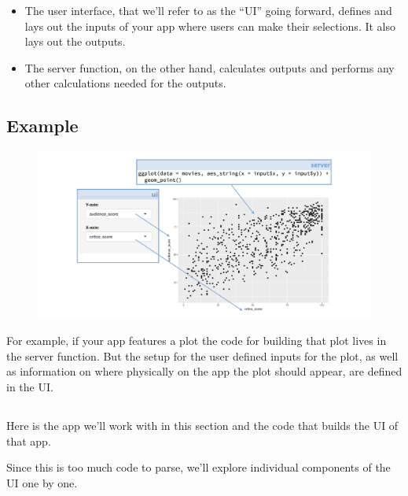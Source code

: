\documentclass[
  letterpaper,
  DIV=11,
  numbers=noendperiod]{scrreprt}
\begin{document}
\begin{itemize}
\item
  The user interface, that we'll refer to as the ``UI'' going forward,
  defines and lays out the inputs of your app where users can make their
  selections. It also lays out the outputs.
\item
  The server function, on the other hand, calculates outputs and
  performs any other calculations needed for the outputs.
\end{itemize}

\hypertarget{example-1}{%
\subsection{Example}\label{example-1}}

\begin{figure}

{\centering \includegraphics[width=1\textwidth,height=\textheight]{./images/ui-to-scatterplot.png}

}

\end{figure}

For example, if your app features a plot the code for building that plot
lives in the server function. But the setup for the user defined inputs
for the plot, as well as information on where physically on the app the
plot should appear, are defined in the UI.

\hypertarget{section-9}{%
\subsection{}\label{section-9}}

Here is the app we'll work with in this section and the code that builds
the UI of that app.

Since this is too much code to parse, we'll explore individual
components of the UI one by one.
\end{document}
